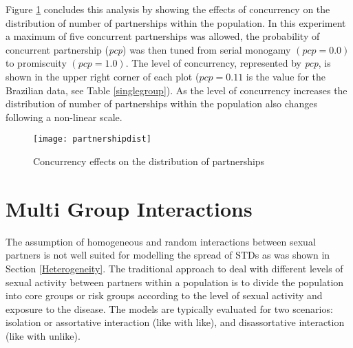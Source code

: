 Figure \ref{partnershipdist} concludes this analysis by showing the effects of
concurrency on the distribution of number of partnerships within the population. In this
experiment a maximum of five concurrent partnerships was allowed, the probability of
concurrent partnership (\emph{pcp}) was then tuned from serial monogamy $(pcp = 0.0)$ to
promiscuity $(pcp = 1.0)$. The level of concurrency, represented by \emph{pcp}, is shown
in the upper right corner of each plot ($pcp = 0.11$ is the value for the Brazilian data,
see Table \ref{singlegroup}). As the level of concurrency increases the distribution of
number of partnerships within the population also changes following a non-linear scale.
\begin{figure}[h]
\texttt{[image: partnershipdist]}
\caption{Concurrency effects on the distribution of partnerships} \label{partnershipdist}
\end{figure}

\section{Multi Group Interactions}

The assumption of homogeneous and random interactions between sexual partners is not well
suited for modelling the spread of STDs as was shown in Section \ref{Heterogeneity}. The
traditional approach to deal with different levels of sexual activity between partners
within a population is to divide the population into core groups or risk groups according
to the level of sexual activity and exposure to the disease. The models are typically
evaluated for two scenarios: isolation or assortative interaction (like with like), and
disassortative interaction (like with unlike).

